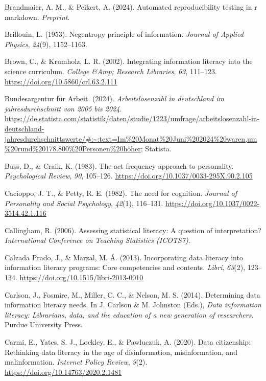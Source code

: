 \documentclass[
  12pt,
  a4paper,
  twoside]{article}
\newlength{\cslhangindent}
\newenvironment{CSLReferences}[2] %
 {\begin{list}{}{%
  \setlength{\itemindent}{0pt}
  \setlength{\leftmargin}{0pt}
  \setlength{\parsep}{0pt}
  \ifodd #1
   \setlength{\leftmargin}{\cslhangindent}
   \setlength{\itemindent}{-1\cslhangindent}
  \fi
  \setlength{\itemsep}{#2\baselineskip}}}
 {\end{list}}
\begin{document}
\begin{CSLReferences}{1}{0}
Brandmaier, A. M., \& Peikert, A. (2024). Automated reproducibility testing in r markdown. \emph{Preprint}.

Brillouin, L. (1953). Negentropy principle of information. \emph{Journal of Applied Physics}, \emph{24}(9), 1152--1163.

Brown, C., \& Krumholz, L. R. (2002). Integrating information literacy into the science curriculum. \emph{College \&Amp; Research Libraries}, \emph{63}, 111--123. \url{https://doi.org/10.5860/crl.63.2.111}

Bundesargentur für Arbeit. (2024). \emph{Arbeitslosenzahl in deutschland im jahresdurchschnitt von 2005 bis 2024}. \url{https://de.statista.com/statistik/daten/studie/1223/umfrage/arbeitslosenzahl-in-deutschland-jahresdurchschnittswerte/\#:~:text=Im\%20Monat\%20Juni\%202024\%20waren,um\%20rund\%20178.800\%20Personen\%20höher}; Statista.

Buss, D., \& Craik, K. (1983). The act frequency approach to personality. \emph{Psychological Review}, \emph{90}, 105--126. \url{https://doi.org/10.1037/0033-295X.90.2.105}

Cacioppo, J. T., \& Petty, R. E. (1982). The need for cognition. \emph{Journal of Personality and Social Psychology}, \emph{42}(1), 116--131. \url{https://doi.org/10.1037/0022-3514.42.1.116}

Callingham, R. (2006). Assessing statistical literacy: A question of interpretation? \emph{International Conference on Teaching Statistics (ICOTS7)}.

Calzada Prado, J., \& Marzal, M. Á. (2013). Incorporating data literacy into information literacy programs: Core competencies and contents. \emph{Libri}, \emph{63}(2), 123--134. \url{https://doi.org/10.1515/libri-2013-0010}

Carlson, J., Fosmire, M., Miller, C. C., \& Nelson, M. S. (2014). Determining data information literacy needs. In J. Carlson \& M. Johnston (Eds.), \emph{Data information literacy: Librarians, data, and the education of a new generation of researchers}. Purdue University Press.

Carmi, E., Yates, S. J., Lockley, E., \& Pawluczuk, A. (2020). Data citizenship: Rethinking data literacy in the age of disinformation, misinformation, and malinformation. \emph{Internet Policy Review}, \emph{9}(2). \url{https://doi.org/10.14763/2020.2.1481}


\end{CSLReferences}
\end{document}
